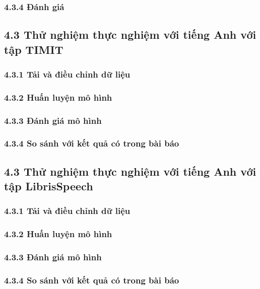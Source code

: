 \documentclass{article}
\begin{document}
	\subsubsection{4.3.4 Đánh giá}
	
	\subsection{4.3 Thử nghiệm thực nghiệm với tiếng Anh với tập TIMIT}
	\subsubsection{4.3.1 Tải và điều chỉnh dữ liệu}
	
	\subsubsection{4.3.2 Huấn luyện mô hình}
	
	\subsubsection{4.3.3 Đánh giá mô hình}
	
	\subsubsection{4.3.4 So sánh với kết quả có trong bài báo}
	
	\subsection{4.3 Thử nghiệm thực nghiệm với tiếng Anh với tập LibrisSpeech}
	\subsubsection{4.3.1 Tải và điều chỉnh dữ liệu}
	
	\subsubsection{4.3.2 Huấn luyện mô hình}
	
	\subsubsection{4.3.3 Đánh giá mô hình}
	
	\subsubsection{4.3.4 So sánh với kết quả có trong bài báo}
	
\end{document}
